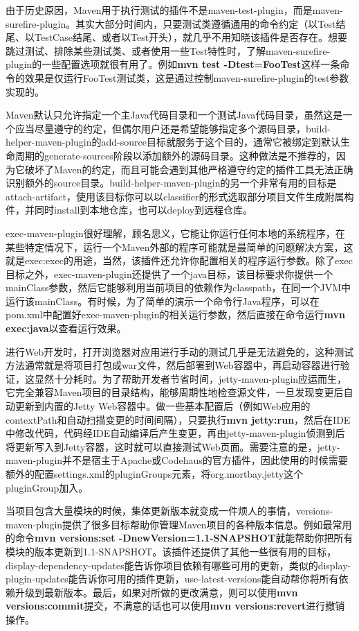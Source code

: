\par 由于历史原因，Maven用于执行测试的插件不是maven-test-plugin，而是maven-surefire-plugin。其实大部分时间内，只要测试类遵循通用的命令约定（以Test结尾、以TestCase结尾、或者以Test开头），就几乎不用知晓该插件是否存在。想要跳过测试、排除某些测试类、或者使用一些Test特性时，了解maven-surefire-plugin的一些配置选项就很有用了。例如\textbf{mvn test -Dtest=FooTest}这样一条命令的效果是仅运行FooTest测试类，这是通过控制maven-surefire-plugin的test参数实现的。
\par Maven默认只允许指定一个主Java代码目录和一个测试Java代码目录，虽然这是一个应当尽量遵守的约定，但偶尔用户还是希望能够指定多个源码目录，build-helper-maven-plugin的add-source目标就服务于这个目的，通常它被绑定到默认生命周期的generate-sources阶段以添加额外的源码目录。这种做法是不推荐的，因为它破坏了Maven的约定，而且可能会遇到其他严格遵守约定的插件工具无法正确识别额外的source目录。build-helper-maven-plugin的另一个非常有用的目标是attach-artifact，使用该目标你可以以classifier的形式选取部分项目文件生成附属构件，并同时install到本地仓库，也可以deploy到远程仓库。
\par exec-maven-plugin很好理解，顾名思义，它能让你运行任何本地的系统程序，在某些特定情况下，运行一个Maven外部的程序可能就是最简单的问题解决方案，这就是exec:exec的用途，当然，该插件还允许你配置相关的程序运行参数。除了exec目标之外，exec-maven-plugin还提供了一个java目标，该目标要求你提供一个mainClass参数，然后它能够利用当前项目的依赖作为classpath，在同一个JVM中运行该mainClass。有时候，为了简单的演示一个命令行Java程序，可以在pom.xml中配置好exec-maven-plugin的相关运行参数，然后直接在命令运行\textbf{mvn exec:java}以查看运行效果。
\par 进行Web开发时，打开浏览器对应用进行手动的测试几乎是无法避免的，这种测试方法通常就是将项目打包成war文件，然后部署到Web容器中，再启动容器进行验证，这显然十分耗时。为了帮助开发者节省时间，jetty-maven-plugin应运而生，它完全兼容Maven项目的目录结构，能够周期性地检查源文件，一旦发现变更后自动更新到内置的Jetty Web容器中。做一些基本配置后（例如Web应用的contextPath和自动扫描变更的时间间隔），只要执行\textbf{mvn jetty:run}，然后在IDE中修改代码，代码经IDE自动编译后产生变更，再由jetty-maven-plugin侦测到后将更新写入到Jetty容器，这时就可以直接测试Web页面。需要注意的是，jetty-maven-plugin并不是宿主于Apache或Codehaus的官方插件，因此使用的时候需要额外的配置settings.xml的pluginGroups元素，将org.mortbay.jetty这个pluginGroup加入。
\par 当项目包含大量模块的时候，集体更新版本就变成一件烦人的事情，versions-maven-plugin提供了很多目标帮助你管理Maven项目的各种版本信息。例如最常用的命令\textbf{mvn versions:set -DnewVersion=1.1-SNAPSHOT}就能帮助你把所有模块的版本更新到1.1-SNAPSHOT。该插件还提供了其他一些很有用的目标，display-dependency-updates能告诉你项目依赖有哪些可用的更新，类似的display-plugin-updates能告诉你可用的插件更新，use-latest-versions能自动帮你将所有依赖升级到最新版本。最后，如果对所做的更改满意，则可以使用\textbf{mvn versions:commit}提交，不满意的话也可以使用\textbf{mvn versions:revert}进行撤销操作。
